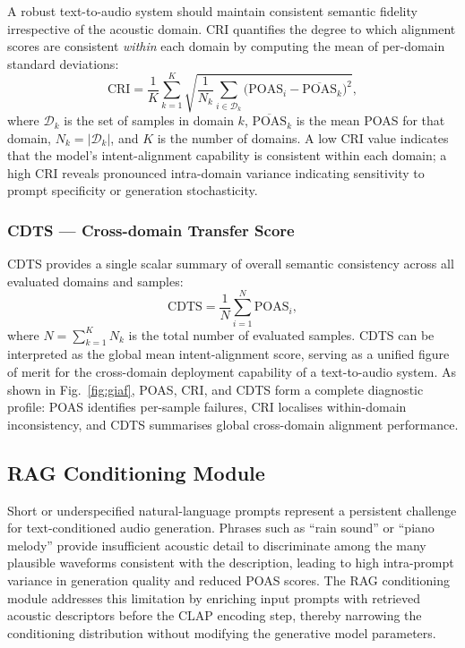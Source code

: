 \documentclass[journal]{IEEEtran}
\begin{document}
A robust text-to-audio system should maintain consistent semantic
fidelity irrespective of the acoustic domain. CRI quantifies the
degree to which alignment scores are consistent \textit{within} each
domain by computing the mean of per-domain standard deviations:
\begin{equation}
  \text{CRI} =
  \frac{1}{K}\sum_{k=1}^{K}
  \sqrt{
    \frac{1}{N_k} \sum_{i \in \mathcal{D}_k}
    \bigl(\text{POAS}_i - \overline{\text{POAS}}_k\bigr)^2
  },
  \label{eq:cri}
\end{equation}
where $\mathcal{D}_k$ is the set of samples in domain $k$,
$\overline{\text{POAS}}_k$ is the mean POAS for that domain,
$N_k = |\mathcal{D}_k|$, and $K$ is the number of domains.
A low CRI value indicates that the model's intent-alignment capability
is consistent within each domain; a high CRI reveals pronounced
intra-domain variance indicating sensitivity to prompt specificity
or generation stochasticity.

\subsubsection{CDTS --- Cross-domain Transfer Score}

CDTS provides a single scalar summary of overall semantic consistency
across all evaluated domains and samples:
\begin{equation}
  \text{CDTS} =
  \frac{1}{N} \sum_{i=1}^{N} \text{POAS}_i,
  \label{eq:cdts}
\end{equation}
where $N = \sum_{k=1}^{K} N_k$ is the total number of evaluated samples.
CDTS can be interpreted as the global mean intent-alignment score,
serving as a unified figure of merit for the cross-domain deployment
capability of a text-to-audio system. As shown in Fig.~\ref{fig:giaf},
POAS, CRI, and CDTS form a complete diagnostic profile: POAS identifies
per-sample failures, CRI localises within-domain inconsistency, and CDTS
summarises global cross-domain alignment performance.

\subsection{RAG Conditioning Module}
\label{sec:rag}

Short or underspecified natural-language prompts represent a persistent
challenge for text-conditioned audio generation. Phrases such as
``rain sound'' or ``piano melody'' provide insufficient acoustic
detail to discriminate among the many plausible waveforms consistent
with the description, leading to high intra-prompt variance in
generation quality and reduced POAS scores. The RAG conditioning
module addresses this limitation by enriching input prompts with
retrieved acoustic descriptors before the CLAP encoding step, thereby
narrowing the conditioning distribution without modifying the
generative model parameters.
\end{document}
